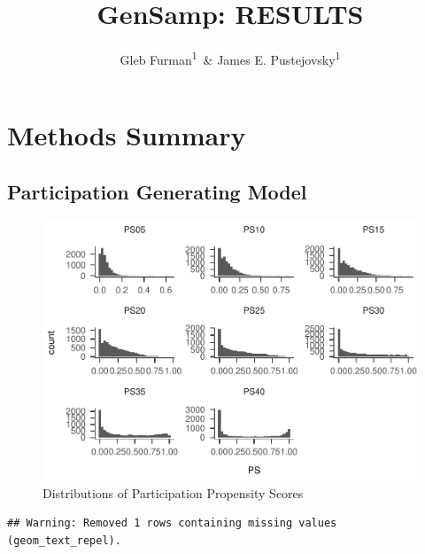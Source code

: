 \documentclass[man,floatsintext]{apa6}
\title{GenSamp: RESULTS}
\author{Gleb Furman\textsuperscript{1}~\& James E. Pustejovsky\textsuperscript{1}}
\date{}
\affiliation{
\vspace{0.5cm}
\textsuperscript{1} University of Texas at Austin}
\begin{document}
\maketitle

\hypertarget{methods-summary}{%
\section{Methods Summary}\label{methods-summary}}

\hypertarget{participation-generating-model}{%
\subsection{Participation Generating Model}\label{participation-generating-model}}

\begin{figure}
\centering
\includegraphics{Results_files/figure-latex/unnamed-chunk-2-1.pdf}
\caption{\label{fig:unnamed-chunk-2}Distributions of Participation Propensity Scores}
\end{figure}

\begin{verbatim}
## Warning: Removed 1 rows containing missing values (geom_text_repel).
\end{verbatim}
\end{document}
